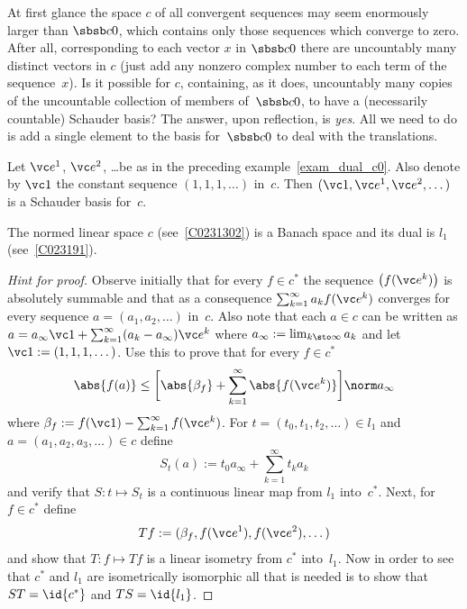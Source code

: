 At first glance the space $c$ of all convergent sequences may seem enormously larger than $\sbsb c0$,
which contains only those sequences which converge to zero.  After all, corresponding to each vector
$x$ in $\sbsb c0$ there are uncountably many distinct vectors in $c$ (just add any nonzero complex
number to each term of the sequence~$x$).  Is it possible for $c$, containing, as it does, uncountably
many copies of the uncountable collection of members of~$\sbsb c0$, to have a (necessarily countable)
Schauder basis?  The answer, upon reflection, is \emph{yes}.  All we need to do is add a single element
to the basis for~$\sbsb c0$ to deal with the translations.

\begin{exam} Let $\vc e^1$, $\vc e^2$, \dots be as in the preceding example~\ref{exam_dual_c0}.  Also
denote by $\vc 1$ the constant sequence $(1,1,1,\dots)$ in~$c$. Then $(\vc 1, \vc e^1, \vc e^2, \dots)$
is a Schauder basis for~$c$.
\end{exam}

\begin{exam}\label{exam_dual_c} The normed linear space $c$ (see~\ref{C0231302})
is a Banach space and its dual is $l_1$ (see~\ref{C023191}).
\end{exam}

\begin{proof}[\emph{Hint for proof}] Observe initially that for every $f \in c^*$ the sequence
$\bigl(f(\vc e^k)\bigr)$ is absolutely summable and that as a consequence $\sum_{k=1}^\infty a_k f(\vc e^k)$
converges for every sequence $a = (a_1,a_2,\dots)$ in~$c$.  Also note that each $a \in c$ can be written as
$a = a_\infty \vc 1 + \sum_{k=1}^\infty (a_k -a_\infty)\vc e^k$ where $a_\infty := \lim_{k \sto \infty}a_k$
and let $\vc 1 := (1,1,1,\dots)$.  Use this to prove that for every $f \in c^*$
   \[ \abs{f(a)} \le \biggl[ \abs{\beta_f} + \sum_{k=1}^\infty \abs{f(\vc e^k)} \biggr] {\norm a}_\infty \]
where $\beta_f := f(\vc 1) - \sum_{k=1}^\infty f(\vc e^k)$.  For $t = (t_0,t_1,t_2,\dots) \in l_1$ and
$a = (a_1,a_2,a_3,\dots) \in c$ define
   \[ S_t(a) := t_0 a_\infty + \sum_{k=1}^\infty t_ka_k \]
and verify that $S\colon t \mapsto S_t$ is a continuous linear map from $l_1$ into~$c^*$.
Next, for $f \in c^*$ define
   \[ Tf := (\beta_f, f(\vc e^1), f(\vc e^2), \dots) \]
and show that $T\colon f \mapsto Tf$ is a linear isometry from $c^*$ into~$l_1$. Now in order to see that $c^*$ and
$l_1$ are isometrically isomorphic all that is needed is to show that $ST = \id{c^*}$ and $TS = \id{l_1}$.  \ns
\end{proof}











